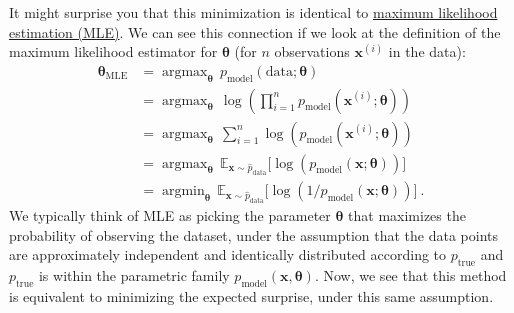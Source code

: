 \documentclass{article}
\DeclareMathOperator*{\argmax}{argmax} %
\DeclareMathOperator*{\argmin}{argmin} %
\begin{document}
It might surprise you that this minimization is identical to \href{https://en.wikipedia.org/wiki/Maximum_likelihood_estimation}{maximum likelihood estimation (MLE)}. We can see this connection if we look at the definition of the maximum likelihood estimator for $\boldsymbol{\theta}$ (for $n$ observations $\textbf{x}^{(i)}$ in the data):
\begin{equation*}
\begin{aligned}
\boldsymbol{\theta}_{\mathrm{MLE}} {} &=
\argmax_{\boldsymbol{\theta}}   \, p_{\mathrm{model}}(\text{data}; \boldsymbol{\theta}) \\ &=
\argmax_{\boldsymbol{\theta}}  \, \log(\prod_{i=1}^n p_{\mathrm{model}}(\textbf{x}^{(i)}; \boldsymbol{\theta})) \\ &=
\argmax_{\boldsymbol{\theta}} \, \sum_{i=1}^n \log( p_{\mathrm{model}}(\textbf{x}^{(i)}; \boldsymbol{\theta})) \\ &= \argmax_{\boldsymbol{\theta}} \, \mathbb{E}_{\textbf{x} \sim \hat{p}_{\mathrm{data}}} \bigr[ \log( p_{\mathrm{model}}(\textbf{x};  \boldsymbol{\theta})) \bigr] \\ &= \argmin_{\boldsymbol{\theta}} \, \mathbb{E}_{\textbf{x} \sim \hat{p}_{\mathrm{data}}} \bigr[ \log( 1/p_{\mathrm{model}}(\textbf{x};  \boldsymbol{\theta})) \bigr] \ .
\end{aligned}
\end{equation*}
We typically think of MLE as picking the parameter $\boldsymbol{\theta}$ that maximizes the probability of observing the dataset, under the assumption that the data points are approximately independent and identically distributed according to $p_{\mathrm{true}}$ and $p_{\mathrm{true}}$ is within the parametric family $p_{\mathrm{model}}(\textbf{x} , \boldsymbol{\theta})$. Now, we see that this method is equivalent to minimizing the expected surprise, under this same assumption.  
\end{document}
